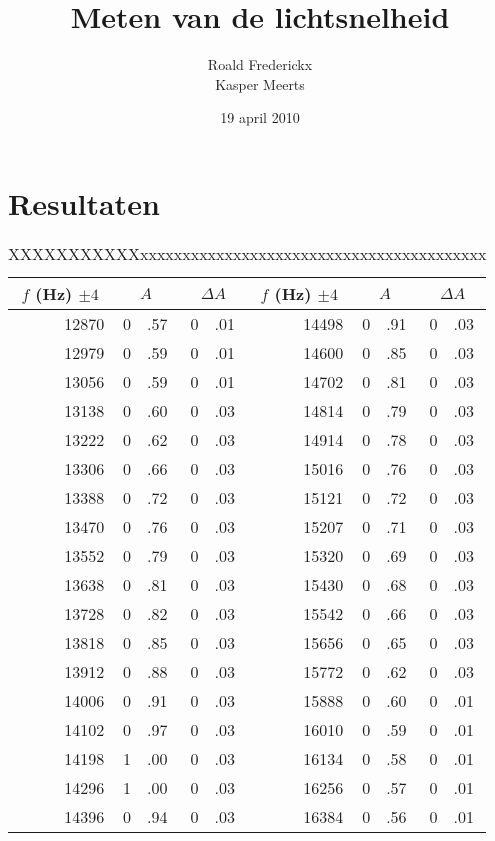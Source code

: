 \documentclass[11pt,a4paper]{article}
\author{Roald Frederickx\\Kasper Meerts}
\title{Meten van de lichtsnelheid}
\date{19 april 2010}
\begin{document}
\graphicspath{{"Afbeeldingen/"}}
\maketitle




\section{Resultaten}



\begin{table}[h!t!b!]
\caption{XXXXXXXXXXXxxxxxxxxxxxxxxxxxxxxxxxxxxxxxxxxxxxxxxxxx}
\label{lucht-tab}
\begin{center}
\begin{tabular}{ r | r@{}l | r@{}l  ||  r | r@{}l | r@{}l }
\multicolumn{1}{c|}{$f$ (Hz) $\pm 4$}&
\multicolumn{2}{c|}{$A$}&
\multicolumn{2}{c||}{$\Delta A$}&
\multicolumn{1}{c|}{$f$ (Hz) $\pm 4$}&
\multicolumn{2}{c|}{$A$}&
\multicolumn{2}{c}{$\Delta A$}\\\hline
12870&	0&.57&	0&.01&	14498&	0&.91&	0&.03\\
12979&	0&.59&	0&.01&	14600&	0&.85&	0&.03\\
13056&	0&.59&	0&.01&	14702&	0&.81&	0&.03\\
13138&	0&.60&	0&.03&	14814&	0&.79&	0&.03\\
13222&	0&.62&	0&.03&	14914&	0&.78&	0&.03\\
13306&	0&.66&	0&.03&	15016&	0&.76&	0&.03\\
13388&	0&.72&	0&.03&	15121&	0&.72&	0&.03\\
13470&	0&.76&	0&.03&	15207&	0&.71&	0&.03\\
13552&	0&.79&	0&.03&	15320&	0&.69&	0&.03\\
13638&	0&.81&	0&.03&	15430&	0&.68&	0&.03\\
13728&	0&.82&	0&.03&	15542&	0&.66&	0&.03\\
13818&	0&.85&	0&.03&	15656&	0&.65&	0&.03\\
13912&	0&.88&	0&.03&	15772&	0&.62&	0&.03\\
14006&	0&.91&	0&.03&	15888&	0&.60&	0&.01\\
14102&	0&.97&	0&.03&	16010&	0&.59&	0&.01\\
14198&	1&.00&	0&.03&	16134&	0&.58&	0&.01\\
14296&	1&.00&	0&.03&	16256&	0&.57&	0&.01\\
14396&	0&.94&	0&.03&	16384&	0&.56&	0&.01\\
\end{tabular}
\end{center}
\end{table}
\end{document}
